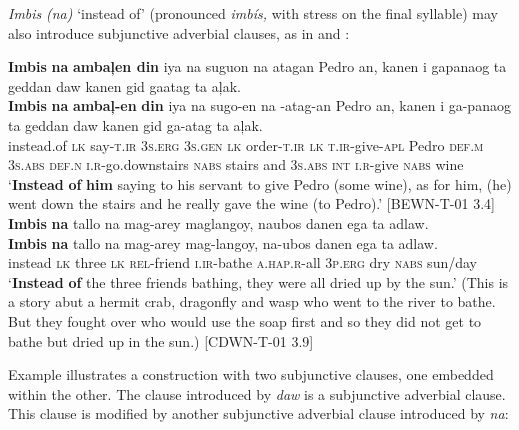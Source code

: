 \textit{Imbis} \textit{(na)} ‘instead of’ (pronounced \textit{imbís,} with stress on the final syllable) may also introduce subjunctive adverbial clauses, as in  and :

\ea
\label{ex:gavethewinetopedro}
\textbf{Imbis}  \textbf{na}  \textbf{ambaļen  din}  iya  na   suguon  na  atagan Pedro  an,  kanen  i  gapanaog  ta  geddan  daw kanen  gid  gaatag  ta  aļak. \smallskip\\
\gll \textbf{Imbis}  \textbf{na}  \textbf{ambaļ-en}  \textbf{din}  iya  na   sugo-en  na  \emptyset{}-atag-an Pedro  an,  kanen  i  ga-panaog  ta  geddan  daw kanen  gid  ga-atag  ta  aļak. \\
instead.of \textsc{lk}  say-\textsc{t.ir} 3\textsc{s.erg}  3\textsc{s.gen}  \textsc{lk}  order-\textsc{t.ir}  \textsc{lk}  \textsc{t.ir}-give-\textsc{apl}
Pedro  \textsc{def.m}  3\textsc{s.abs}  \textsc{def.n}  \textsc{i.r}-go.downstairs  \textsc{nabs}  stairs  and
3\textsc{s.abs}  \textsc{int}  \textsc{i.r}-give  \textsc{nabs}  wine \\
\glt `\textbf{Instead} \textbf{of} \textbf{him} saying to his servant to give Pedro (some wine), as for him, (he) went down the stairs and he really gave the wine (to Pedro).’ [BEWN-T-01 3.4]
\z
\ea
\label{ex:driedupinthesun}
\textbf{Imbis}  \textbf{na}  tallo  na  mag-arey  maglangoy,  naubos  danen  ega  ta  adlaw. \smallskip\\
\gll \textbf{Imbis}  \textbf{na}  tallo  na  mag-arey  mag-langoy,  na-ubos  danen  ega  ta  adlaw. \\
instead  \textsc{lk}  three  \textsc{lk}  \textsc{rel}-friend  \textsc{i.ir}-bathe  \textsc{a.hap.r}-all  3\textsc{p.erg} dry  \textsc{nabs}  sun/day \\
\glt ‘\textbf{Instead} \textbf{of} the three friends bathing, they were all dried up by the sun.’ (This is a story abut a hermit crab, dragonfly and wasp who went to the river to bathe. But they fought over who would use the soap first and so they did not get to bathe but dried up in the sun.) [CDWN-T-01 3.9]
\z

Example  illustrates a construction with two subjunctive clauses, one embedded within the other. The clause introduced by \textit{daw} is a subjunctive adverbial clause. This clause is modified by another subjunctive adverbial clause introduced by \textit{na}:

